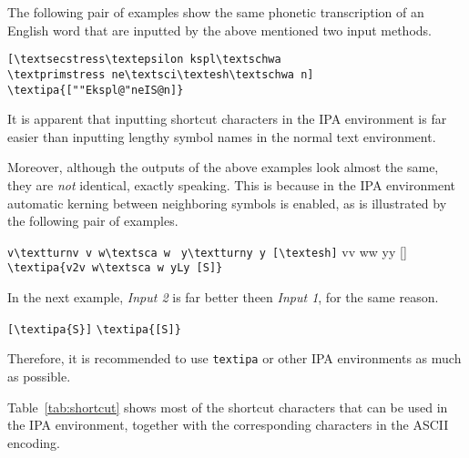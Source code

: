 The following pair of examples show the same phonetic transcription of 
an English word that are inputted by the above mentioned two input methods.

\begin{tipaexample}
  \xitem
    \verb|[\textsecstress\textepsilon kspl\textschwa|\\
    \verb|\textprimstress ne\textsci\textesh\textschwa n]|
  \xitem \verb|\textipa{[""Ekspl@"neIS@n]}|
  \xitem {}
\end{tipaexample}

It is apparent that inputting shortcut characters in the IPA
environment is far easier than inputting lengthy symbol names in the
normal text environment.

Moreover, although the outputs of the above examples look
almost the same, they are \textsl{not\/} identical, exactly
speaking. This is because in the IPA environment automatic kerning
between neighboring symbols is enabled, as is illustrated by the
following pair of examples.

\begin{tipaexample}
  \xitem \verb|v\textturnv v w\textsca w |
         \verb|y\textturny y [\textesh]|
  \xitem v\textturnv v w\textsca w y\textturny y [\textesh]
  \xitem \verb|\textipa{v2v w\textsca w yLy [S]}|
  \xitem {}
\end{tipaexample}

In the next example, \emph{Input 2} is far better theen \emph{Input 1}, 
for the same reason.

\begin{tipaexample}
  \xitem \verb|[\textipa{S}]|
  \xitem [\textipa{S}]
  \xitem \verb|\textipa{[S]}|
  \xitem \textipa{[S]}
\end{tipaexample}

Therefore, it is recommended to use \texttt{\tbs textipa} or other IPA
environments as much as possible.

Table~\ref{tab:shortcut} shows most of the shortcut characters that
can be used in the IPA environment, together with the corresponding
characters in the ASCII encoding.


